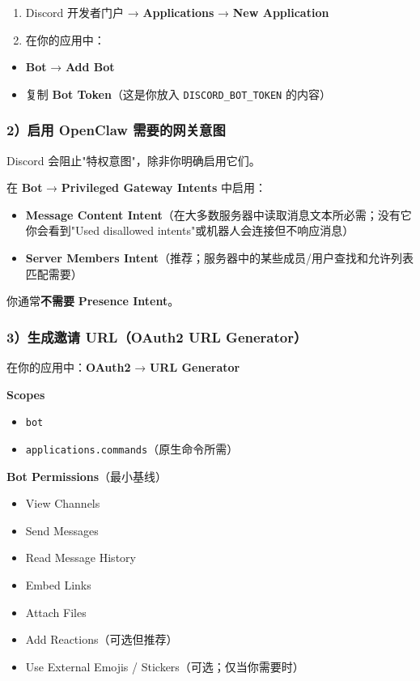 \begin{enumerate}
  \item Discord 开发者门户 → \textbf{Applications} → \textbf{New Application}
  \item 在你的应用中：
\end{enumerate}

\begin{itemize}
  \item \textbf{Bot} → \textbf{Add Bot}
  \item 复制 \textbf{Bot Token}（这是你放入 \texttt{DISCORD\_BOT\_TOKEN} 的内容）
\end{itemize}


\subsubsection{2）启用 OpenClaw 需要的网关意图}


Discord 会阻止"特权意图"，除非你明确启用它们。

在 \textbf{Bot} → \textbf{Privileged Gateway Intents} 中启用：

\begin{itemize}
  \item \textbf{Message Content Intent}（在大多数服务器中读取消息文本所必需；没有它你会看到"Used disallowed intents"或机器人会连接但不响应消息）
  \item \textbf{Server Members Intent}（推荐；服务器中的某些成员/用户查找和允许列表匹配需要）
\end{itemize}


你通常\textbf{不需要} \textbf{Presence Intent}。

\subsubsection{3）生成邀请 URL（OAuth2 URL Generator）}


在你的应用中：\textbf{OAuth2} → \textbf{URL Generator}

\textbf{Scopes}

\begin{itemize}
  \item {} \texttt{bot}
  \item {} \texttt{applications.commands}（原生命令所需）
\end{itemize}


\textbf{Bot Permissions}（最小基线）

\begin{itemize}
  \item {} View Channels
  \item {} Send Messages
  \item {} Read Message History
  \item {} Embed Links
  \item {} Attach Files
  \item {} Add Reactions（可选但推荐）
  \item {} Use External Emojis / Stickers（可选；仅当你需要时）
\end{itemize}


